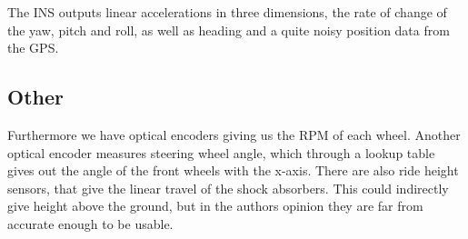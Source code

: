 The INS outputs linear accelerations in three dimensions, the rate of change of the yaw, pitch and roll, as well as heading and a quite noisy position data from the GPS. 

\subsection{Other}
Furthermore we have optical encoders giving us the RPM of each wheel. Another optical encoder measures steering wheel angle, which through a lookup table gives out the angle of the front wheels with the x-axis. There are also ride height sensors, that give the linear travel of the shock absorbers. This could indirectly give height above the ground, but in the authors opinion they are far from accurate enough to be usable.